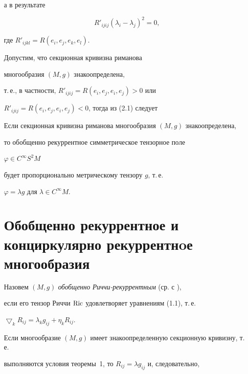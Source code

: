 а в результате


\begin{equation}


R'_{ijij} (\lambda_i-\lambda_j)^2=0,


\end{equation}


где $R'_{ijkl}=R(e_i,e_j,e_k,e_l)$.





Допустим, что секционная кривизна риманова 


многообразия $(M,g)$ знакоопределена,


т.\,е., в частности, $R'_{ijij}=R(e_i,e_j,e_i,e_j) > 0$ или


$R'_{ijij}=R(e_i,e_j,e_i,e_j) < 0$, тогда из (2.1) следует





\begin{thm}


Если секционная кривизна риманова многообразия $(M,g)$ знакоопределена,


то обобщенно рекуррентное симметрическое тензорное поле


$\varphi\in C^\infty S^2M$


будет пропорционально метрическому тензору $g$, т.\,е.


$\varphi=\lambda g$ для $\lambda \in C^\infty M$.


\end{thm}





\section{Обобщенно рекуррентное и конциркулярно рекуррентнoе многообразия}





Назовем $(M,g)$ {\it обобщенно Риччи-рекуррентным} (ср. с \cite{tr4}),


если его тензор Риччи $\operatorname{Ric}$ удовлетворяет уравнениям (1.1), т.\,е.


$\bigtriangledown_k R_{ij}=\lambda_k g_{ij}+\eta_kR_{ij}$.





Если многообразие $(M,g)$ имеет знакоопределенную секционную кривизну, т.\,е.


выполняются условия теоремы~1, то $R_{ij}=\lambda g_{ij}$ и, следовательно,


